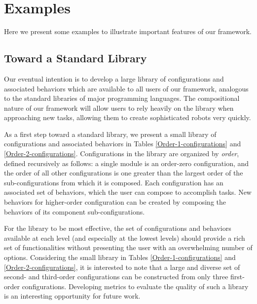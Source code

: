 \documentclass[conference]{IEEEtran}
\theoremstyle{definition}
\begin{document}
\section{Examples}
Here we present some examples to illustrate important features of our framework.
\subsection{Toward a Standard Library}
Our eventual intention is to develop a large library of configurations and associated
behaviors which are available to all users of our framework, analogous to the standard
libraries of major programming languages.  The compositional nature of our framework
will allow users to rely heavily on the library when approaching new tasks, allowing
them to create sophisticated robots very quickly.

As a first step toward a standard library, we present a small library of configurations
and associated behaviors in Tables \ref{Order-1-configurations} and \ref{Order-2-configurations}.
Configurations in the library are organized by \textit{order}, defined recursively
as follows: a single module is an order-zero configuration, and the order of all
other configurations is one greater than the largest order of the sub-configurations
from which it is composed. Each configuration has an associated set of behaviors,
which the user can compose to accomplish tasks.  New behaviors for higher-order configuration can be created by composing the behaviors of its component sub-configurations.

For the library to be most effective, the set of configurations and behaviors available
 at each level (and especially at the lowest levels) should provide a rich set of
 functionalities without presenting the user with an overwhelming number of options. 
 Considering the small library in Tables \ref{Order-1-configurations} and \ref{Order-2-configurations},
 it is interested to note that a large  and diverse set of second- and third-order configurations can
be constructed from only three first-order configurations. Developing metrics to
evaluate the quality of such a library is an interesting opportunity for future work. 
\end{document}
